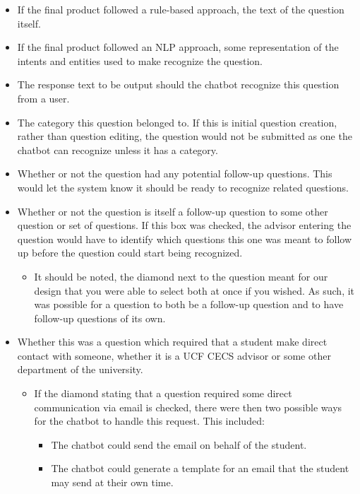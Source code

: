 \documentclass[titlepage, 12pt]{article}
\begin{document}
\begin{itemize}
    \item If the final product followed a rule-based approach, the text of the question itself.
    \item If the final product followed an NLP approach, some representation of the intents and entities used to make recognize the question.
    \item The response text to be output should the chatbot recognize this question from a user.
    \item The category this question belonged to. If this is initial question creation, rather than question editing, the question would not be submitted as one the chatbot can recognize unless it has a category. 
    \item Whether or not the question had any potential follow-up questions. This would let the system know it should be ready to recognize related questions.
    \item Whether or not the question is itself a follow-up question to some other question or set of questions. If this box was checked, the advisor entering the question would have to identify which questions this one was meant to follow up before the question could start being recognized. 
    \begin{itemize}
        \item It should be noted, the diamond next to the question meant for our design that you were able to select both at once if you wished. As such, it was possible for a question to both be a follow-up question and to have follow-up questions of its own.
    \end{itemize}
    \item Whether this was a question which required that a student make direct contact with someone, whether it is a UCF CECS advisor or some other department of the university.
    \begin{itemize}
        \item If the diamond stating that a question required some direct communication via email is checked, there were then two possible ways for the chatbot to handle this request. This included:
        \begin{itemize}
            \item The chatbot could send the email on behalf of the student.
            \item The chatbot could generate a template for an email that the student may send at their own time.
        \end{itemize}

\end{itemize}
\end{itemize}
\end{document}
